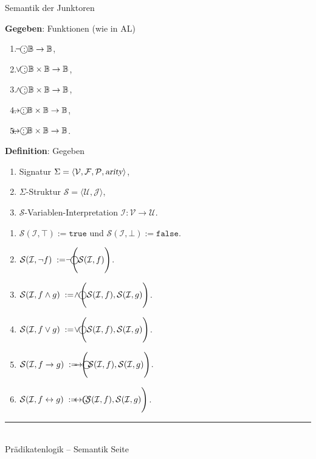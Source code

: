 \documentclass{slides}
\newcommand{\myrule}{\rule{20cm}{1mm}\\ }
\newcommand{\verum}{\top}
\newcommand{\falsum}{\bot}
\newcommand{\struct}{\mathcal{S}}
\newcommand{\circneg}{\mbox{$\bigcirc\hspace*{-0.54cm}\neg$}}
\newcommand{\circwedge}{\mbox{$\bigcirc\hspace*{-0.52cm}\wedge$}}
\newcommand{\circvee}{\mbox{$\bigcirc\hspace*{-0.52cm}\vee$}}
\newcommand{\circright}{\mbox{$\bigcirc\hspace*{-0.79cm}\rightarrow$}}
\newcommand{\circleftright}{\mbox{$\bigcirc\hspace*{-0.79cm}\leftrightarrow$}}
\newcounter{mypage}
\begin{document}

\begin{slide}{}
\normalsize
\begin{center}
Semantik der Junktoren
\end{center}
\vspace{0.5cm}

\footnotesize
\textbf{Gegeben}: Funktionen (wie in AL)
\begin{enumerate}
\item $\circneg: \mathbb{B} \rightarrow \mathbb{B}$,
\item $\circvee: \mathbb{B} \times \mathbb{B} \rightarrow \mathbb{B}$,
\item $\circwedge: \mathbb{B} \times \mathbb{B} \rightarrow \mathbb{B}$,
\item $\circright: \mathbb{B} \times \mathbb{B} \rightarrow \mathbb{B}$,
\item $\circleftright: \mathbb{B} \times \mathbb{B} \rightarrow \mathbb{B}$.
\end{enumerate}

\textbf{Definition}: Gegeben
\begin{enumerate}
\item Signatur $\Sigma = \langle \mathcal{V}, \mathcal{F}, \mathcal{P}, \textsl{arity} \rangle$,
\item $\Sigma$-Struktur $\struct = \langle \mathcal{U}, \mathcal{J} \rangle$,
\item $\struct$-Variablen-Interpretation $\mathcal{I}: \mathcal{V} \rightarrow \mathcal{U}$.
\end{enumerate}
\begin{enumerate}
\item $\struct(\mathcal{I},\verum) := \mathtt{true}$ und $\struct(\mathcal{I},\falsum) := \mathtt{false}$.
\item $\struct(\mathcal{I}, \neg f) \;:=\; \circneg\Bigg(\struct(\mathcal{I}, f)\Bigg)$.
\item $\struct(\mathcal{I}, f \wedge g) \;:=\; \circwedge\Bigg(\struct(\mathcal{I}, f), \struct(\mathcal{I}, g)\Bigg)$.
\item $\struct(\mathcal{I}, f \vee g) \;:=\; \circvee\Bigg(\struct(\mathcal{I}, f), \struct(\mathcal{I}, g)\Bigg)$.
\item $\struct(\mathcal{I}, f \rightarrow g) \;:=\; \circright\!\Bigg(\struct(\mathcal{I}, f), \struct(\mathcal{I}, g)\Bigg)$.
\item $\struct(\mathcal{I}, f \leftrightarrow g) \;:=\; \circleftright(\struct(\mathcal{I}, f), \struct(\mathcal{I}, g)\Bigg)$.
\end{enumerate}


\vspace*{\fill}
\tiny \addtocounter{mypage}{1}
\myrule
Pr\"{a}dikatenlogik -- Semantik  \hspace*{\fill} Seite 
\end{slide}
\end{document}
